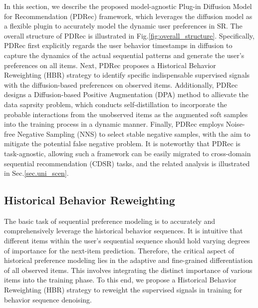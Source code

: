 \documentclass[letterpaper]{article} %
\begin{document}
In this section, we describe the proposed model-agnostic Plug-in Diffusion Model for Recommendation (PDRec) framework, which leverages the diffusion model as a flexible plugin to accurately model the dynamic user preferences in SR. The overall structure of PDRec is illustrated in Fig.\ref{fig:overall_structure}. Specifically, PDRec first explicitly regards the user behavior timestamps in diffusion to capture the dynamics of the actual sequential patterns and generate the user's preferences on all items. Next, PDRec proposes a Historical Behavior Reweighting (HBR) strategy to identify specific indispensable supervised signals with the diffusion-based preferences on observed items. Additionally, PDRec designs a Diffusion-based Positive Augmentation (DPA) method to allievate the data saprsity problem, which conducts self-distillation to incorporate the probable interactions from the unobserved items as the augmented soft samples into the training process in a dynamic manner. Finally, PDRec employs Noise-free Negative Sampling (NNS) to select stable negative samples, with the aim to mitigate the potential false negative problem. It is noteworthy that PDRec is task-agnostic, allowing such a framework can be easily migrated to cross-domain sequential recommendation (CDSR) tasks, and the related analysis is illustrated in Sec.\ref{sec.uni_scen}.


\subsection{Historical Behavior Reweighting}
The basic task of sequential preference modeling is to accurately and comprehensively leverage the historical behavior sequences. It is intuitive that different items within the user's sequential sequence should hold varying degrees of importance for the next-item prediction. Therefore, the critical aspect of historical preference modeling lies in the adaptive and fine-grained differentiation of all observed items. This involves integrating the distinct importance of various items into the training phase. To this end, we propose a Historical Behavior Reweighting (HBR) strategy to reweight the supervised signals in training for behavior sequence denoising.
\end{document}
